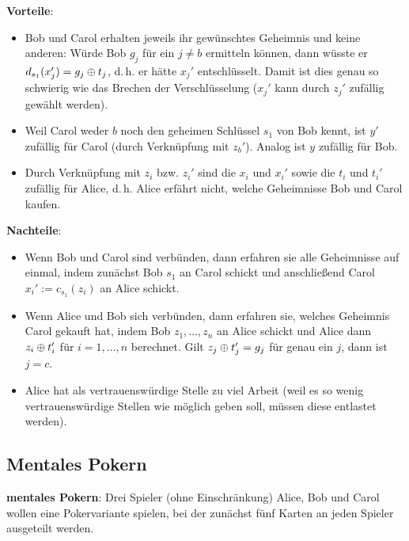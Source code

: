 \textbf{Vorteile}:
\begin{itemize}
    \item
    Bob und Carol erhalten jeweils ihr gewünschtes Geheimnis und keine anderen:
    Würde Bob $g_j$ für ein $j \not= b$ ermitteln können, dann wüsste er
    $d_{s_1}(x_j') = g_j \oplus t_j$, d.\,h. er hätte $x_j'$ entschlüsselt.
    Damit ist dies genau so schwierig wie das Brechen der Verschlüsselung
    ($x_j'$ kann durch $z_j'$ zufällig gewählt werden).
    
    \item
    Weil Carol weder $b$ noch den geheimen Schlüssel $s_1$ von Bob kennt,
    ist $y'$ zufällig für Carol (durch Verknüpfung mit $z_b'$).
    Analog ist $y$ zufällig für Bob.
    
    \item
    Durch Verknüpfung mit $z_i$ bzw. $z_i'$ sind die $x_i$ und $x_i'$
    sowie die $t_i$ und $t_i'$ zufällig für Alice,
    d.\,h. Alice erfährt nicht, welche Geheimnisse Bob und Carol kaufen.
\end{itemize}

\textbf{Nachteile}:
\begin{itemize}
    \item 
    Wenn Bob und Carol sind verbünden, dann erfahren sie alle Geheimnisse auf einmal,
    indem zunächst Bob $s_1$ an Carol schickt und
    anschließend Carol $x_i' := c_{s_1}(z_i)$ an Alice schickt.
    
    \item
    Wenn Alice und Bob sich verbünden, dann erfahren sie, welches Geheimnis Carol gekauft hat,
    indem Bob $z_1, \dotsc, z_n$ an Alice schickt
    und Alice dann $z_i \oplus t_i'$ für $i = 1, \dotsc, n$ berechnet.
    Gilt $z_j \oplus t_j' = g_j$ für genau ein $j$, dann ist $j = c$.
    
    \item
    Alice hat als vertrauenswürdige Stelle zu viel Arbeit
    (weil es so wenig vertrauenswürdige Stellen wie möglich geben soll,
    müssen diese entlastet werden).
\end{itemize}

\pagebreak

\subsection{%
    Mentales Pokern%
}

\textbf{mentales Pokern}:
Drei Spieler (ohne Einschränkung) Alice, Bob und Carol wollen eine Pokervariante spielen,
bei der zunächst fünf Karten an jeden Spieler ausgeteilt werden.

